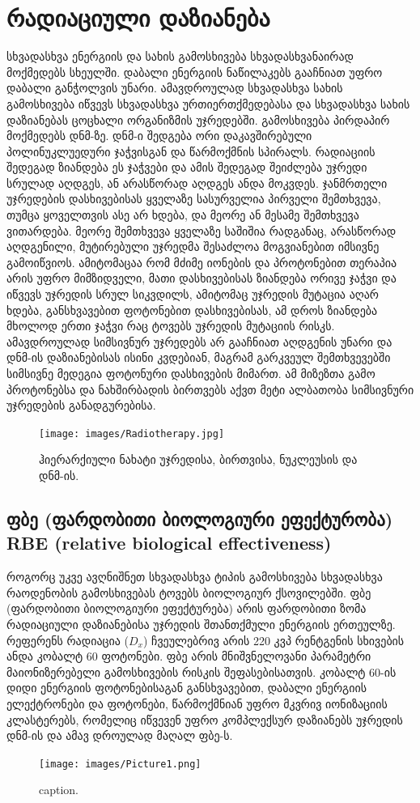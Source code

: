 \documentclass[12pt,a4paper,]{report}
\begin{document}
\chapter{რადიაციული დაზიანება}
სხვადასხვა ენერგიის და სახის გამოსხივება სხვადასხვანაირად მოქმედებს სხეულში. დაბალი ენერგიის ნაწილაკებს გააჩნიათ უფრო დაბალი განჭოლვის უნარი. ამავდროულად სხვადასხვა სახის გამოსხივება იწვევს სხვადასხვა ურთიერთქმედებასა და  სხვადასხვა სახის დაზიანებას ცოცხალი ორგანიზმის უჯრედებში. გამოსხივება პირდაპირ მოქმედებს დნმ-ზე. დნმ-ი შედგება ორი დაკავშირებული პოლინუკლუედური ჯაჭვისგან და წარმოქმნის სპირალს. რადიაციის შედეგად ზიანდება ეს ჯაჭვები და ამის შედეგად შეიძლება უჯრედი სრულად აღდგეს, ან არასწორად აღდგეს ანდა მოკვდეს. ჯანმრთელი უჯრედების დასხივებისას ყველაზე სასურველია პირველი შემთხვევა, თუმცა ყოველთვის ასე არ ხდება, და მეორე ან მესამე შემთხვევა ვითარდება. მეორე შემთხვევა ყველაზე საშიშია რადგანაც, არასწორად აღდგენილი, მუტირებული უჯრედმა შესაძლოა მოგვიანებით იმსივნე გამოიწვიოს. ამიტომაცაა რომ მძიმე იონების და პროტონებით თერაპია არის უფრო მიმზიდველი, მათი დასხივებისას ზიანდება ორივე ჯაჭვი და იწვევს უჯრედის სრულ სიკვდილს, ამიტომაც უჯრედის მუტაცია აღარ ხდება, განსხვავებით ფოტონებით დასხივებისას, ამ დროს ზიანდება მხოლოდ ერთი ჯაჭვი რაც ტოვებს უჯრედის მუტაციის რისკს. ამავდროულად სიმსივნურ უჯრედებს არ გააჩნიათ აღდგენის უნარი და დნმ-ის დაზიანებისას ისინი კვდებიან, მაგრამ გარკვეულ შემთხვევებში სიმსივნე მედეგია ფოტონური დასხივების მიმართ. ამ მიზეზთა გამო პროტონებსა და ნახშირბადის ბირთვებს აქვთ მეტი ალბათობა სიმსივნური უჯრედების განადგურებისა.

	\begin{figure}[htp]
	    \centering
        \texttt{[image: images/Radiotherapy.jpg]}
        \caption{ჰიერარქიული ნახატი უჯრედისა, ბირთვისა, ნუკლეუსის და დნმ-ის.}
        \label{fig:1}
    \end{figure}

\section{ფბე (ფარდობითი ბიოლოგიური ეფექტურობა) RBE (relative biological effectiveness)} 
როგორც უკვე ავღნიშნეთ სხვადასხვა ტიპის გამოსხივება სხვადასხვა რაოდენობის გამოსხივებას ტოვებს ბიოლოგიურ ქსოვილებში. ფბე (ფარდობითი ბიოლოგიური ეფექტურება) არის ფარდობითი ზომა რადიაციული დაზიანებისა უჯრედის შთანთქმული ენერგიის ერთეულზე.
რეფერენს რადიაცია ($D_x$) ჩვეულებრივ არის 220 კვპ რენტგენის სხივების ანდა კობალტ 60 ფოტონები. ფბე არის მნიშვნელოვანი პარამეტრი მაიონიზერებელი გამოსხივების რისკის შეფასებისათვის. კობალტ 60-ის დიდი ენერგიის ფოტონებისაგან განსხვავებით, დაბალი ენერგიის ელექტრონები და ფოტონები, წარმოქმნიან უფრო მკვრივ იონიზაციის კლასტერებს, რომელიც იწვევენ უფრო კომპლექსურ დაზიანებს უჯრედის დნმ-ის და ამავ დროულად მაღალ ფბე-ს.
	\begin{figure}[htp]
	    \centering
        \texttt{[image: images/Picture1.png]}
        \caption{caption.}
        \label{fig:1}
    \end{figure}
\end{document}
